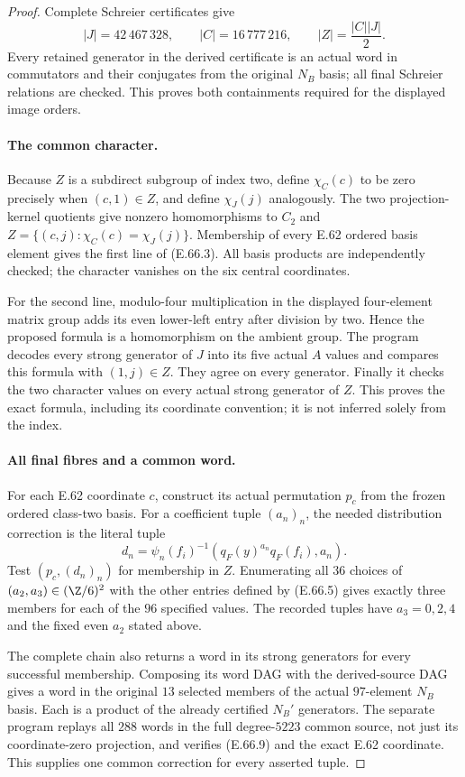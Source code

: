 \begin{proof}
Complete Schreier certificates give
\[
 |J|=42\,467\,328,\qquad |C|=16\,777\,216,
 \qquad |Z|=\frac{|C||J|}{2}.
 \tag{E.66.8}
\]
Every retained generator in the derived certificate is an actual
word in commutators and their conjugates from the original
$N_B$ basis; all final Schreier relations are checked. This proves
both containments required for the displayed image orders.

\paragraph{The common character.}
Because $Z$ is a subdirect subgroup of index two, define
$\chi_C(c)$ to be zero precisely when $(c,1)\in Z$, and define
$\chi_J(j)$ analogously. The two projection-kernel quotients
give nonzero homomorphisms to $C_2$ and
$Z=\{(c,j):\chi_C(c)=\chi_J(j)\}$. Membership of every E.62
ordered basis element gives the first line of
\textup{(E.66.3)}. All basis products are independently checked;
the character vanishes on the six central coordinates.

For the second line, modulo-four multiplication in the displayed
four-element matrix group adds its even lower-left entry after
division by two. Hence the proposed formula is a homomorphism
on the ambient group. The program decodes every strong generator
of $J$ into its five actual $A$ values and compares this formula
with $(1,j)\in Z$. They agree on every generator. Finally it
checks the two character values on every actual strong generator
of $Z$. This proves the exact formula, including its coordinate
convention; it is not inferred solely from the index.

\paragraph{All final fibres and a common word.}
For each E.62 coordinate $c$, construct its actual permutation
$p_c$ from the frozen ordered class-two basis. For a coefficient
tuple $(a_n)_n$, the needed distribution correction is the literal
tuple
\[
 d_n=\psi_n(f_i)^{-1}(q_F(y)^{a_n}q_F(f_i),a_n).
 \tag{E.66.9}
\]
Test $(p_c,(d_n)_n)$ for membership in $Z$. Enumerating all
$36$ choices of $(a_2,a_3)\in(\Z/6)^2$ with the other entries
defined by \textup{(E.66.5)} gives exactly three members for
each of the $96$ specified values. The recorded tuples have
$a_3=0,2,4$ and the fixed even $a_2$ stated above.

The complete chain also returns a word in its strong generators
for every successful membership. Composing its word DAG with the
derived-source DAG gives a word in the original $13$ selected
members of the actual $97$-element $N_B$ basis. Each is a product
of the already certified $N_B'$ generators. The separate program
replays all $288$ words in the full degree-$5223$ common source,
not just its coordinate-zero projection, and verifies
\textup{(E.66.9)} and the exact E.62 coordinate. This supplies
one common correction for every asserted tuple.


\end{proof}
